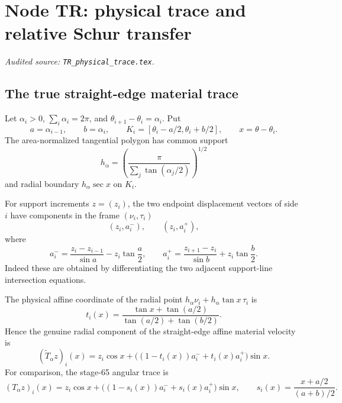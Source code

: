 \begingroup
\section{Node TR: physical trace and relative Schur transfer}
\label{module:TR}
\noindent\textit{Audited source: \nolinkurl{TR_physical_trace.tex}.}
\subsection{The true straight-edge material trace}

Let $\alpha_i>0$, $\sum_i\alpha_i=2\pi$, and
$\theta_{i+1}-\theta_i=\alpha_i$.  Put
\begin{equation}\label{TR:eq:fan}
 a=\alpha_{i-1},\qquad b=\alpha_i,\qquad
 K_i=[\theta_i-a/2,\theta_i+b/2],\qquad x=\theta-\theta_i.
\end{equation}
The area-normalized tangential polygon has common support
\begin{equation}\label{TR:eq:h}
 h_\alpha=\left(\frac\pi{\sum_j\tan(\alpha_j/2)}\right)^{1/2}
\end{equation}
and radial boundary $h_\alpha\sec x$ on $K_i$.

For support increments $z=(z_i)$, the two endpoint displacement vectors
of side $i$ have components in the frame $(\nu_i,\tau_i)$
\begin{equation}\label{TR:eq:endpoint-components}
 (z_i,a_i^-),\qquad (z_i,a_i^+),
\end{equation}
where
\begin{equation}\label{TR:eq:apm}
 a_i^-=\frac{z_i-z_{i-1}}{\sin a}-z_i\tan\frac a2,
 \qquad
 a_i^+=\frac{z_{i+1}-z_i}{\sin b}+z_i\tan\frac b2.
\end{equation}
Indeed these are obtained by differentiating the two adjacent support-line
intersection equations.

The physical affine coordinate of the radial point
$h_\alpha\nu_i+h_\alpha\tan x\,\tau_i$ is
\begin{equation}\label{TR:eq:t}
 t_i(x)=\frac{\tan x+\tan(a/2)}
 {\tan(a/2)+\tan(b/2)}.
\end{equation}
Hence the genuine radial component of the straight-edge affine material
velocity is
\begin{equation}\label{TR:eq:Tphysical}
 (\widetilde{T}_\alpha z)_i(x)
 =z_i\cos x+
 \bigl((1-t_i(x))a_i^-+t_i(x)a_i^+\bigr)\sin x.
\end{equation}
For comparison, the stage-65 angular trace is
\begin{equation}\label{TR:eq:Tangular}
 (T_\alpha z)_i(x)
 =z_i\cos x+
 \bigl((1-s_i(x))a_i^-+s_i(x)a_i^+\bigr)\sin x,
 \qquad
 s_i(x)=\frac{x+a/2}{(a+b)/2}.
\end{equation}


